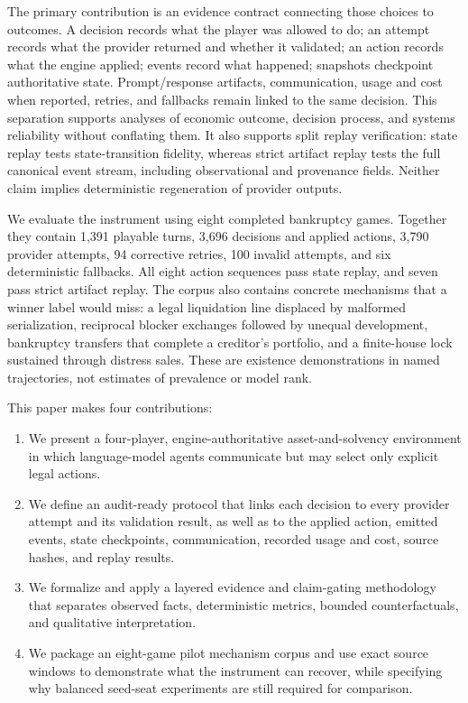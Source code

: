 \documentclass[conference]{IEEEtran}
\begin{document}
The primary contribution is an evidence contract connecting those choices to
outcomes. A decision records what the player was allowed to do; an attempt
records what the provider returned and whether it validated; an action records
what the engine applied; events record what happened; snapshots checkpoint
authoritative state. Prompt/response artifacts, communication, usage and cost
when reported, retries, and fallbacks remain linked to the same decision. This
separation supports analyses of economic outcome, decision process, and systems
reliability without conflating them. It also supports split replay verification:
state replay tests state-transition fidelity, whereas strict artifact replay
tests the full canonical event stream, including observational and provenance
fields. Neither claim
implies deterministic regeneration of provider outputs.

We evaluate the instrument using eight completed bankruptcy games. Together
they contain 1,391 playable turns, 3,696 decisions and applied actions, 3,790
provider attempts, 94 corrective retries, 100 invalid attempts, and six
deterministic fallbacks. All eight action sequences pass state replay, and
seven pass strict artifact replay. The corpus also contains concrete
mechanisms that a winner label would miss: a legal liquidation line displaced
by malformed serialization, reciprocal blocker exchanges followed by unequal
development, bankruptcy transfers that complete a creditor's portfolio, and
a finite-house lock sustained through distress sales. These are existence
demonstrations in named trajectories, not estimates of prevalence or model
rank.

This paper makes four contributions:
\begin{enumerate}
    \item We present a four-player, engine-authoritative asset-and-solvency
    environment in which language-model agents communicate but may select
    only explicit legal actions.
    \item We define an audit-ready protocol that links each decision to every
    provider attempt and its validation result, as well as to the applied
    action, emitted events, state checkpoints, communication, recorded usage
    and cost, source hashes, and replay results.
    \item We formalize and apply a layered evidence and claim-gating
    methodology that separates observed facts, deterministic metrics, bounded
    counterfactuals, and qualitative interpretation.
    \item We package an eight-game pilot mechanism corpus and use exact source
    windows to demonstrate what the instrument can recover, while specifying
    why balanced seed-seat experiments are still required for comparison.
\end{enumerate}
\end{document}
